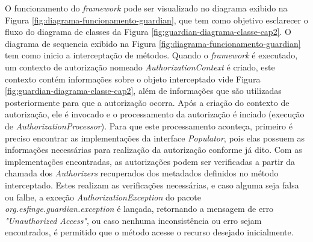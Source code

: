 \par O funcionamento do \textit{framework} pode ser visualizado no diagrama exibido na Figura \ref{fig:diagrama-funcionamento-guardian}, que tem como objetivo esclarecer o fluxo do diagrama de classes da Figura \ref{fig:guardian-diagrama-classe-cap2}. O diagrama de sequencia exibido na Figura \ref{fig:diagrama-funcionamento-guardian} tem como inicio a interceptação de métodos. Quando o \textit{framework} é executado, um contexto de autorização nomeado \textit{AuthorizationContext} é criado, este contexto contém informações sobre o objeto interceptado vide Figura \ref{fig:guardian-diagrama-classe-cap2}, além de informações que são utilizadas posteriormente para que a autorização ocorra. Após a criação do contexto de autorização, ele é invocado e o processamento da autorização é inciado (execução de \textit{AuthorizationProcessor}). Para que este processamento aconteça, primeiro é preciso encontrar as implementações da interface \textit{Populator}, pois elas possuem as informações necessárias para realização da autorização conforme já dito. Com as implementações encontradas, as autorizações podem ser verificadas a partir da chamada dos \textit{Authorizers} recuperados dos metadados definidos no método interceptado. Estes realizam as verificações necessárias, e caso alguma seja falsa ou falhe, a exceção \textit{AuthorizationException} do pacote \textit{org.esfinge.guardian.exception} é lançada, retornando a mensagem de erro \textit{"Unauthorized Access"}, ou caso nenhuma inconsistência ou erro sejam encontrados, é permitido que o método acesse o recurso desejado inicialmente.

